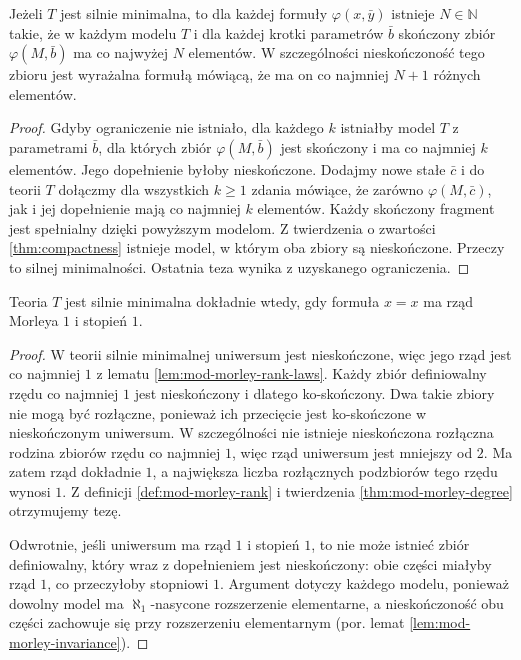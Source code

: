 \begin{lemat}
\label{lem:mod-strong-minimal-uniform}
Jeżeli $T$ jest silnie minimalna, to dla każdej
formuły $\varphi(x,\bar y)$ istnieje $N\in\mathbb N$
takie, że w każdym modelu $T$ i dla każdej
krotki parametrów $\bar b$ skończony zbiór
$\varphi(M,\bar b)$ ma co najwyżej $N$ elementów.
W szczególności nieskończoność tego zbioru
jest wyrażalna formułą mówiącą, że ma on
co najmniej $N+1$ różnych elementów.
\end{lemat}
\begin{proof}
Gdyby ograniczenie nie istniało, dla każdego $k$
istniałby model $T$ z parametrami $\bar b$,
dla których zbiór $\varphi(M,\bar b)$ jest
skończony i ma co najmniej $k$ elementów.
Jego dopełnienie byłoby nieskończone.
Dodajmy nowe stałe $\bar c$ i do teorii $T$
dołączmy dla wszystkich $k\geq1$ zdania
mówiące, że zarówno $\varphi(M,\bar c)$,
jak i jej dopełnienie mają co najmniej $k$
elementów. Każdy skończony fragment jest
spełnialny dzięki powyższym modelom.
Z twierdzenia o zwartości \ref{thm:compactness}
istnieje model, w którym oba zbiory są
nieskończone. Przeczy to silnej minimalności.
Ostatnia teza wynika z uzyskanego ograniczenia.
\end{proof}

\begin{wniosek}
\label{cor:mod-strong-minimal-rank}
Teoria $T$ jest silnie minimalna dokładnie wtedy,
gdy formuła $x=x$ ma rząd Morleya $1$ i stopień $1$.
\end{wniosek}
\begin{proof}
W teorii silnie minimalnej uniwersum jest
nieskończone, więc jego rząd jest co najmniej $1$
z lematu \ref{lem:mod-morley-rank-laws}.
Każdy zbiór definiowalny rzędu co najmniej $1$
jest nieskończony i dlatego ko-skończony.
Dwa takie zbiory nie mogą być rozłączne, ponieważ
ich przecięcie jest ko-skończone w nieskończonym
uniwersum. W szczególności nie istnieje nieskończona
rozłączna rodzina zbiorów rzędu co najmniej $1$,
więc rząd uniwersum jest mniejszy od $2$.
Ma zatem rząd dokładnie $1$, a największa liczba
rozłącznych podzbiorów tego rzędu wynosi $1$.
Z definicji \ref{def:mod-morley-rank} i twierdzenia
\ref{thm:mod-morley-degree} otrzymujemy tezę.

Odwrotnie, jeśli uniwersum ma rząd $1$
i stopień $1$, to nie może istnieć zbiór
definiowalny, który wraz z dopełnieniem jest
nieskończony: obie części miałyby rząd $1$,
co przeczyłoby stopniowi $1$.
Argument dotyczy każdego modelu, ponieważ
dowolny model ma $\aleph_1$-nasycone rozszerzenie
elementarne, a nieskończoność obu części
zachowuje się przy rozszerzeniu elementarnym
(por. lemat \ref{lem:mod-morley-invariance}).
\end{proof}


